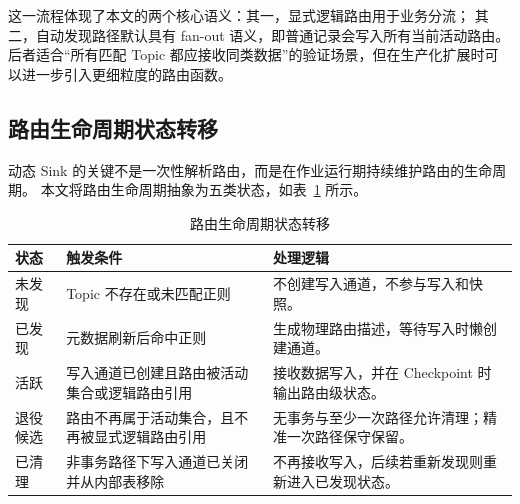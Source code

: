 这一流程体现了本文的两个核心语义：其一，显式逻辑路由用于业务分流；
其二，自动发现路径默认具有 fan-out 语义，即普通记录会写入所有当前活动路由。
后者适合“所有匹配 Topic 都应接收同类数据”的验证场景，但在生产化扩展时可以进一步引入更细粒度的路由函数。

\subsection{路由生命周期状态转移}

动态 Sink 的关键不是一次性解析路由，而是在作业运行期持续维护路由的生命周期。
本文将路由生命周期抽象为五类状态，如表~\ref{tab:route-lifecycle} 所示。

\begin{table}[htbp]
  \centering
  \caption{路由生命周期状态转移}
  \label{tab:route-lifecycle}
  \begin{tabular}{p{}p{}p{}}
    \toprule
    状态 & 触发条件 & 处理逻辑 \\
    \midrule
    未发现 & Topic 不存在或未匹配正则 & 不创建写入通道，不参与写入和快照。 \\
    已发现 & 元数据刷新后命中正则 & 生成物理路由描述，等待写入时懒创建通道。 \\
    活跃 & 写入通道已创建且路由被活动集合或逻辑路由引用 & 接收数据写入，并在 Checkpoint 时输出路由级状态。 \\
    退役候选 & 路由不再属于活动集合，且不再被显式逻辑路由引用 & 无事务与至少一次路径允许清理；精准一次路径保守保留。 \\
    已清理 & 非事务路径下写入通道已关闭并从内部表移除 & 不再接收写入，后续若重新发现则重新进入已发现状态。 \\
    \bottomrule
  \end{tabular}
\end{table}

